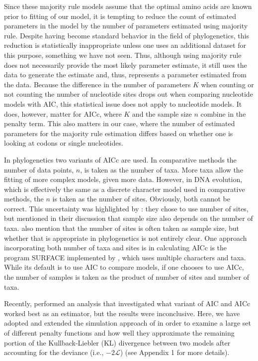 \documentclass[12pt,letterpaper,fleqn]{article}
\newcommand{\Lik}{\ensuremath{\mathcal{L}}\xspace}%
\begin{document}
Since these majority rule models assume that the optimal amino acids are known prior to fitting of our model, it is tempting to reduce the count of estimated parameters in the model by the number of parameters estimated using majority rule.
Despite having become standard behavior in the field of phylogenetics, this reduction is statistically inappropriate unless one uses an additional dataset for this purpose, something we have not seen.
Thus, although using majority rule does not necessarily provide the most likely parameter estimate, it still uses the data to generate the estimate and, thus, represents a parameter estimated from the data.
Because the difference in the number of parameters $K$ when counting or not counting the number of nucleotide sites drops out when comparing nucleotide models with AIC, this statistical issue does not apply to nucleotide models.
It does, however, matter for AICc, where $K$ and the sample size $n$ combine in the penalty term.
This also matters in our case, where the number of estimated parameters for the majority rule estimation differs based on whether one is looking at codons or single nucleotides.

In phylogenetics two variants of AICc are used.
In comparative methods \citep[e.g.~][]{ButlerKing2004, OMearaetal2006, BeaulieuEtAl2013} the number of data points, $n$, is taken as the number of taxa.
More taxa allow the fitting of more complex models, given more data.
However, in DNA evolution, which is effectively the same as a discrete character model used in comparative methods, the $n$ is taken as the number of sites.
Obviously, both cannot be correct.
This uncertainty was highlighted by \citet{posadaBuckley2004}: they chose to use number of sites, but mentioned in their discussion that sample size also depends on the number of taxa.
\citet{SullivanJoyce2005} also mention that the number of sites is often taken as sample size, but whether that is appropriate in phylogenetics is not entirely clear.
One approach incorporating both number of taxa and sites is in calculating AICc is the program SURFACE implemented by \citet{IngramMahler2013}, which uses multiple characters and taxa.
While its default is to use AIC to compare models, if one chooses to use AICc, the number of samples is taken as the product of number of sites and number of taxa.

Recently, \citet{Jhwuengetal2014} performed an analysis that investigated what variant of AIC and AICc worked best as an estimator, but the results were inconclusive.
Here, we have adopted and extended the simulation approach of \citet{Jhwuengetal2014} in order to examine a large set of different penalty functions and how well they approximate the remaining portion of the Kullback-Liebler (KL) divergence between two models after accounting for the deviance (i.e., $-2\Lik$) (see Appendix 1 for more details).
\end{document}
